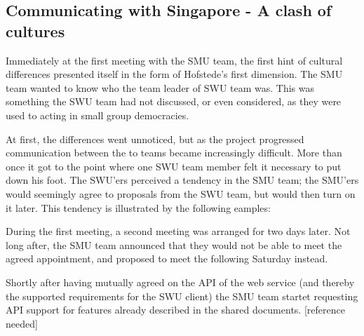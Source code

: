 \subsection{Communicating with Singapore - A clash of cultures}
\label{sec:communicating}

Immediately at the first meeting with the SMU team, the  first hint of cultural
differences presented itself in the form of Hofstede's first
dimension\cite{surprises}. The SMU team wanted to know who the team leader of SWU team was.
This was something the SWU team had not discussed, or even considered, as they were used to acting in small group democracies.

At first, the differences went unnoticed, but as the project progressed
communication between the to teams became increasingly difficult. More than
once it got to the point where one SWU team member felt it necessary to put
down his foot.\cite{enough}
The SWU'ers perceived a tendency in the SMU team; the SMU'ers would seemingly agree to proposals from the SWU team, but would then turn on it later.
This tendency is illustrated by the following eamples:

During the first meeting, a second meeting was arranged for two
days later. Not long after, the SMU team announced that they would
not be able to meet the agreed appointment, and proposed to meet 
the following Saturday instead.

Shortly after having mutually agreed on the API of the web
service (and thereby the supported requirements for the SWU client)
the SMU team startet requesting API support for features already
described in the shared documents. [reference needed]
